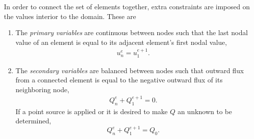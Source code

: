 In order to connect the set of elements together, extra constraints are imposed on the values interior to the domain.  These are
\begin{enumerate}
  \item The \emph{primary variables} are continuous between nodes such that the last nodal value of an element is equal to its adjacent element's first nodal value,
  \begin{align}
    \label{primary_variable_continuity}
    u_n^e = u_1^{e+1}.
  \end{align}
  \item The \emph{secondary variables} are balanced between nodes such that outward flux from a connected element is equal to the negative outward flux of its neighboring node,
  \begin{align}
    \label{secondary_variable_continuity}
    Q_n^e + Q_1^{e+1} = 0.
  \end{align}
  If a point source is applied or it is desired to make $Q$ an unknown to be determined,
  $$Q_n^e + Q_1^{e+1} = Q_0.$$
\end{enumerate}

